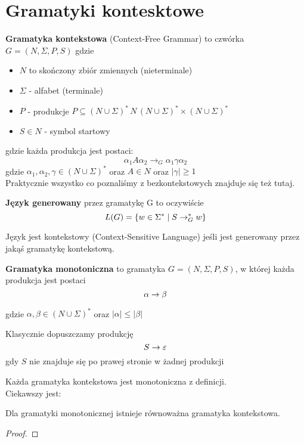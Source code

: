 \section{Gramatyki kontesktowe}

\begin{definition}
\textbf{Gramatyka kontekstowa} (Context-Free Grammar) to czwórka \( G = (N, \Sigma, P, S) \) gdzie
\begin{itemize}
    \item \( N \) to skończony zbiór zmiennych (nieterminale)
    \item \( \Sigma \) - alfabet (terminale)
    \item \( P \) - produkcje \( P \subseteq  
    (N \cup \Sigma)^* \, N \, 
    (N \cup \Sigma)^* \times 
    (N \cup \Sigma)^* \)
    \item \( S \in N \) - symbol startowy
\end{itemize}
\end{definition}
gdzie każda produkcja jest postaci:
\[
    \alpha_1 A \alpha_2 \rightarrow_G \alpha_1 \gamma \alpha_2
\]
gdzie \( \alpha_1, \alpha_2, \gamma \in (N \cup \Sigma)^* \) oraz \( A \in N \)
oraz \( |\gamma| \geq 1\) \\
Praktycznie wszystko co poznaliśmy z bezkontekstowych znajduje się też tutaj.

\begin{definition}
    \textbf{Język  generowany} przez gramatykę G to oczywiście 
    \[
        L(G) = \set{w \in \Sigma^* \mid S \rightarrow_G^* w}
    \]
\end{definition}

\begin{definition}
    Język jest kontekstowy (Context-Sensitive Language) jeśli jest generowany przez jakąś gramatykę kontekstową.
\end{definition}

\begin{definition}
    \textbf{Gramatyka monotoniczna} to gramatyka \( G = (N, \Sigma, P, S) \), w której
    każda produkcja jest postaci
    \[
        \alpha \rightarrow \beta \\
    \]
\end{definition}
    gdzie \( \alpha, \beta \in (N \cup \Sigma)^* \) oraz \( |\alpha| \leq |\beta|\)

Klasycznie dopuszczamy produkcję
\[
        S \rightarrow \varepsilon
\]
gdy \( S\) nie znajduje się po prawej stronie w żadnej produkcji

Każda gramatyka kontekstowa jest monotoniczna z definicji.\\
Ciekawszy jest:\\
\begin{lemma}
    Dla gramatyki monotonicznej istnieje równoważna gramatyka kontekstowa.

\end{lemma}
\begin{proof}

\end{proof}